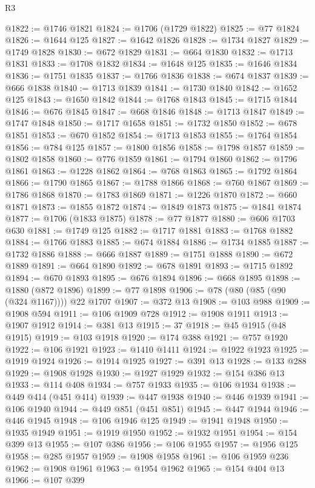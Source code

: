 \begin{lexlean}{R3}
\begin{coremodule}
@1822 := @1746 @1821
@1824 := @1706 (@1729 @1822)
@1825 := @77 @1824
@1826 := @1644 @125
@1827 := @1642 @1826
@1828 := @1734 @1827
@1829 := @1749 @1828
@1830 := @672 @1829
@1831 := @664 @1830
@1832 := @1713 @1831
@1833 := @1708 @1832
@1834 := @1648 @125
@1835 := @1646 @1834
@1836 := @1751 @1835
@1837 := @1766 @1836
@1838 := @674 @1837
@1839 := @666 @1838
@1840 := @1713 @1839
@1841 := @1730 @1840
@1842 := @1652 @125
@1843 := @1650 @1842
@1844 := @1768 @1843
@1845 := @1715 @1844
@1846 := @676 @1845
@1847 := @668 @1846
@1848 := @1713 @1847
@1849 := @1747 @1848
@1850 := @1717 @1658
@1851 := @1732 @1850
@1852 := @678 @1851
@1853 := @670 @1852
@1854 := @1713 @1853
@1855 := @1764 @1854
@1856 := @784 @125
@1857 := @1800 @1856
@1858 := @1798 @1857
@1859 := @1802 @1858
@1860 := @776 @1859
@1861 := @1794 @1860
@1862 := @1796 @1861
@1863 := @1228 @1862
@1864 := @768 @1863
@1865 := @1792 @1864
@1866 := @1790 @1865
@1867 := @1788 @1866
@1868 := @760 @1867
@1869 := @1786 @1868
@1870 := @1783 @1869
@1871 := @1226 @1870
@1872 := @660 @1871
@1873 := @1855 @1872
@1874 := @1849 @1873
@1875 := @1841 @1874
@1877 := @1706 (@1833 @1875)
@1878 := @77 @1877
@1880 := @606 @1703 @630
@1881 := @1749 @125
@1882 := @1717 @1881
@1883 := @1768 @1882
@1884 := @1766 @1883
@1885 := @674 @1884
@1886 := @1734 @1885
@1887 := @1732 @1886
@1888 := @666 @1887
@1889 := @1751 @1888
@1890 := @672 @1889
@1891 := @664 @1890
@1892 := @678 @1891
@1893 := @1715 @1892
@1894 := @670 @1893
@1895 := @676 @1894
@1896 := @668 @1895
@1898 := @1880 (@872 @1896)
@1899 := @77 @1898
@1906 := @78 (@80 (@85 (@90 (@324 @1167)))) @22 @1707
@1907 := @372 @13
@1908 := @103 @988
@1909 := @1908 @594
@1911 := @106 @1909 @728
@1912 := @1908 @1911
@1913 := @1907 @1912
@1914 := @381 @13
@1915 := 37
@1918 := @45 @1915 (@48 @1915)
@1919 := @103 @1918
@1920 := @174 @388
@1921 := @757 @1920
@1922 := @106 @1921
@1923 := @1410 @1411
@1924 := @1922 @1923
@1925 := @1919 @1924
@1926 := @1914 @1925
@1927 := @391 @13
@1928 := @133 @288
@1929 := @1908 @1928
@1930 := @1927 @1929
@1932 := @154 @386 @13
@1933 := @114 @408
@1934 := @757 @1933
@1935 := @106 @1934
@1938 := @449 @414 (@451 @414)
@1939 := @447 @1938
@1940 := @446 @1939
@1941 := @106 @1940
@1944 := @449 @851 (@451 @851)
@1945 := @447 @1944
@1946 := @446 @1945
@1948 := @106 @1946 @125
@1949 := @1941 @1948
@1950 := @1935 @1949
@1951 := @1919 @1950
@1952 := @1932 @1951
@1954 := @154 @399 @13
@1955 := @107 @386
@1956 := @106 @1955
@1957 := @1956 @125
@1958 := @285 @1957
@1959 := @1908 @1958
@1961 := @106 @1959 @236
@1962 := @1908 @1961
@1963 := @1954 @1962
@1965 := @154 @404 @13
@1966 := @107 @399

\end{coremodule}
\end{lexlean}
